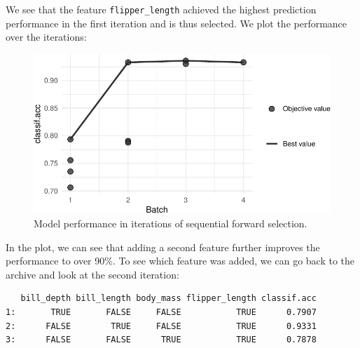We see that the feature \texttt{flipper\_length} achieved the highest
prediction performance in the first iteration and is thus selected. We
plot the performance over the iterations:

\begin{Shaded}
\begin{Highlighting}[]
 \NormalTok{)}
\end{Highlighting}
\end{Shaded}

\begin{figure}

{\centering \includegraphics[width=1\textwidth,height=\textheight]{chapters/chapter6/feature_selection_files/figure-pdf/fig-forwardselection-1.pdf}

}

\caption{\label{fig-forwardselection}Model performance in iterations of
sequential forward selection.}

\end{figure}

In the plot, we can see that adding a second feature further improves
the performance to over 90\%. To see which feature was added, we can go
back to the archive and look at the second iteration:

\begin{Shaded}
\begin{Highlighting}[]
\NormalTok{dt[batch\_nr }\SpecialCharTok{==} \NormalTok{, }\SpecialCharTok{:}\NormalTok{]}
\end{Highlighting}
\end{Shaded}

\begin{verbatim}
   bill_depth bill_length body_mass flipper_length classif.acc
1:       TRUE       FALSE     FALSE           TRUE      0.7907
2:      FALSE        TRUE     FALSE           TRUE      0.9331
3:      FALSE       FALSE      TRUE           TRUE      0.7878
\end{verbatim}

